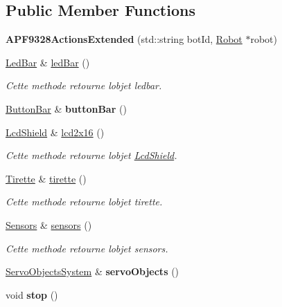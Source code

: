 \subsection*{Public Member Functions}
\begin{DoxyCompactItemize}
\item 
\mbox{\label{classAPF9328ActionsExtended_a3f541c37f1297936e3eb9da6c6cc83f8}} 
{\bfseries A\+P\+F9328\+Actions\+Extended} (std\+::string bot\+Id, \hyperlink{classRobot}{Robot} $\ast$robot)
\item 
\hyperlink{classLedBar}{Led\+Bar} \& \hyperlink{classAPF9328ActionsExtended_a8293d356c7168ec4c6ef799ff84c7c32}{led\+Bar} ()
\begin{DoxyCompactList}\small\item\em Cette methode retourne l\textquotesingle{}objet ledbar. \end{DoxyCompactList}\item 
\mbox{\label{classAPF9328ActionsExtended_a2a639290c4fd7ab8dcd8c44d7463727f}} 
\hyperlink{classButtonBar}{Button\+Bar} \& {\bfseries button\+Bar} ()
\item 
\hyperlink{classLcdShield}{Lcd\+Shield} \& \hyperlink{classAPF9328ActionsExtended_a78ff0ab1aa0d6e4d68d694ee330e43b3}{lcd2x16} ()
\begin{DoxyCompactList}\small\item\em Cette methode retourne l\textquotesingle{}objet \hyperlink{classLcdShield}{Lcd\+Shield}. \end{DoxyCompactList}\item 
\hyperlink{classTirette}{Tirette} \& \hyperlink{classAPF9328ActionsExtended_aaf101fe098410bb891706249a064c8e7}{tirette} ()
\begin{DoxyCompactList}\small\item\em Cette methode retourne l\textquotesingle{}objet tirette. \end{DoxyCompactList}\item 
\hyperlink{classSensors}{Sensors} \& \hyperlink{classAPF9328ActionsExtended_a341c3cc5e7d3a0ad60cf6d4bf511596c}{sensors} ()
\begin{DoxyCompactList}\small\item\em Cette methode retourne l\textquotesingle{}objet sensors. \end{DoxyCompactList}\item 
\mbox{\label{classAPF9328ActionsExtended_ae6c836265501683ff47ed392a8f1c27e}} 
\hyperlink{classServoObjectsSystem}{Servo\+Objects\+System} \& {\bfseries servo\+Objects} ()
\item 
\mbox{\label{classAPF9328ActionsExtended_a5146d8e61057cb4d09e1ff50fb8182e7}} 
void {\bfseries stop} ()
\end{DoxyCompactItemize}


